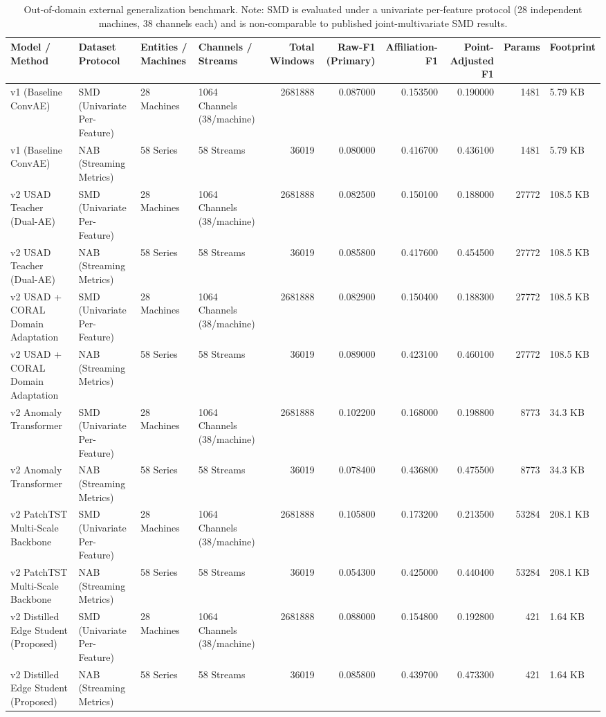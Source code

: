 \begin{table}
\caption{Out-of-domain external generalization benchmark. Note: SMD is evaluated under a univariate per-feature protocol (28 independent machines, 38 channels each) and is non-comparable to published joint-multivariate SMD results.}
\begin{tabular}{llllrrrrrl}
\toprule
Model / Method & Dataset Protocol & Entities / Machines & Channels / Streams & Total Windows & Raw-F1 (Primary) & Affiliation-F1 & Point-Adjusted F1 & Params & Footprint \\
\midrule
v1 (Baseline ConvAE) & SMD (Univariate Per-Feature) & 28 Machines & 1064 Channels (38/machine) & 2681888 & 0.087000 & 0.153500 & 0.190000 & 1481 & 5.79 KB \\
v1 (Baseline ConvAE) & NAB (Streaming Metrics) & 58 Series & 58 Streams & 36019 & 0.080000 & 0.416700 & 0.436100 & 1481 & 5.79 KB \\
v2 USAD Teacher (Dual-AE) & SMD (Univariate Per-Feature) & 28 Machines & 1064 Channels (38/machine) & 2681888 & 0.082500 & 0.150100 & 0.188000 & 27772 & 108.5 KB \\
v2 USAD Teacher (Dual-AE) & NAB (Streaming Metrics) & 58 Series & 58 Streams & 36019 & 0.085800 & 0.417600 & 0.454500 & 27772 & 108.5 KB \\
v2 USAD + CORAL Domain Adaptation & SMD (Univariate Per-Feature) & 28 Machines & 1064 Channels (38/machine) & 2681888 & 0.082900 & 0.150400 & 0.188300 & 27772 & 108.5 KB \\
v2 USAD + CORAL Domain Adaptation & NAB (Streaming Metrics) & 58 Series & 58 Streams & 36019 & 0.089000 & 0.423100 & 0.460100 & 27772 & 108.5 KB \\
v2 Anomaly Transformer & SMD (Univariate Per-Feature) & 28 Machines & 1064 Channels (38/machine) & 2681888 & 0.102200 & 0.168000 & 0.198800 & 8773 & 34.3 KB \\
v2 Anomaly Transformer & NAB (Streaming Metrics) & 58 Series & 58 Streams & 36019 & 0.078400 & 0.436800 & 0.475500 & 8773 & 34.3 KB \\
v2 PatchTST Multi-Scale Backbone & SMD (Univariate Per-Feature) & 28 Machines & 1064 Channels (38/machine) & 2681888 & 0.105800 & 0.173200 & 0.213500 & 53284 & 208.1 KB \\
v2 PatchTST Multi-Scale Backbone & NAB (Streaming Metrics) & 58 Series & 58 Streams & 36019 & 0.054300 & 0.425000 & 0.440400 & 53284 & 208.1 KB \\
v2 Distilled Edge Student (Proposed) & SMD (Univariate Per-Feature) & 28 Machines & 1064 Channels (38/machine) & 2681888 & 0.088000 & 0.154800 & 0.192800 & 421 & 1.64 KB \\
v2 Distilled Edge Student (Proposed) & NAB (Streaming Metrics) & 58 Series & 58 Streams & 36019 & 0.085800 & 0.439700 & 0.473300 & 421 & 1.64 KB \\
\bottomrule
\end{tabular}
\end{table}
